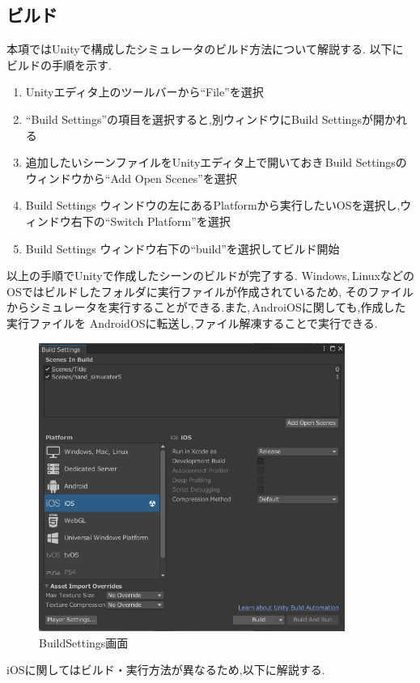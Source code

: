 \documentclass{ltjsreport}
\begin{document}
		\subsection{ビルド}
			本項ではUnityで構成したシミュレータのビルド方法について解説する.
			以下にビルドの手順を示す.
			\begin{enumerate}
				\item Unityエディタ上のツールバーから``File''を選択
				\item ``Build Settings''の項目を選択すると,別ウィンドウにBuild Settingsが開かれる
				\item 追加したいシーンファイルをUnityエディタ上で開いておき\,Build Settingsのウィンドウから``Add Open Scenes''を選択
				\item Build Settings ウィンドウの左にあるPlatformから実行したいOSを選択し,ウィンドウ右下の``Switch Platform''を選択
				\item Build Settings ウィンドウ右下の``build''を選択してビルド開始
			\end{enumerate}
			以上の手順でUnityで作成したシーンのビルドが完了する.
			Windows,\,LinuxなどのOSではビルドしたフォルダに実行ファイルが作成されているため,
			そのファイルからシミュレータを実行することができる.また,\,AndroiOSに関しても,作成した実行ファイルを
			AndroidOSに転送し,ファイル解凍することで実行できる.

			\begin{figure}[H]
			\centering
			\includegraphics[width = 10cm]{../figs/BuildSettings.png}
			\caption{BuildSettings画面}
			\label{fig:BuildSettings}
			\end{figure}
\vspace{-15pt}
			iOSに関してはビルド・実行方法が異なるため,以下に解説する.
\end{document}
